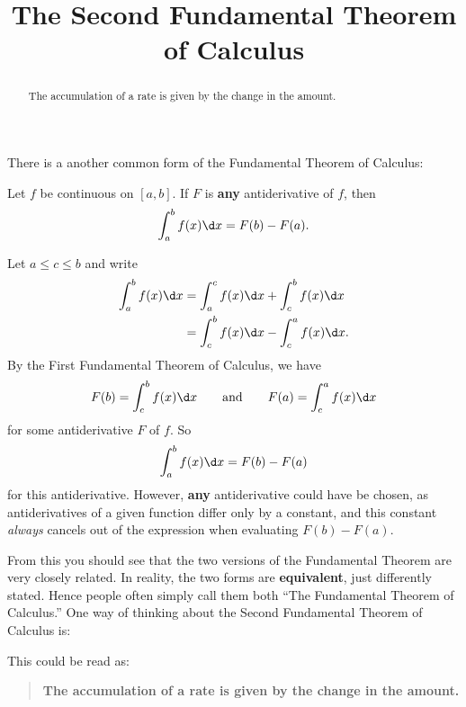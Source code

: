 \documentclass{ximera}
\title[Dig-In:]{The Second Fundamental Theorem of Calculus}
\begin{document}
\begin{abstract}
The accumulation of a rate is given by the change in the amount.
\end{abstract}
\maketitle




There is a another common form of the Fundamental Theorem of Calculus:

\begin{theorem}
  Let $f$ be continuous on $[a,b]$. If $F$ is \textbf{any}
  antiderivative of $f$, then
  \[
  \int_a^b f(x)\d x = F(b)-F(a).
  \]
  \begin{explanation}
    Let $a\le c\le b$ and write
    \begin{align*}
      \int_a^b f(x) \d x &= \int_a^c f(x) \d x + \int_c^b f(x) \d x \\
      &= \int_c^b f(x) \d x - \int_c^a f(x) \d x.
    \end{align*}
    By the First Fundamental Theorem of Calculus, we have
    \[
    F(b) = \int_c^b f(x) \d x\qquad\text{and}\qquad F(a) = \int_c^a f(x) \d x
    \] 
    for some antiderivative $F$ of $f$. So
    \[
    \int_a^b f(x) \d x = F(b)-F(a)
    \]
    for this antiderivative. However, \textbf{any} antiderivative
    could have be chosen, as antiderivatives of a given function
    differ only by a constant, and this constant \textit{always}
    cancels out of the expression when evaluating $F(b)-F(a)$.
\end{explanation}
\end{theorem}

From this you should see that the two versions of the Fundamental
Theorem are very closely related. In reality, the two forms are
\textbf{equivalent}, just differently stated. Hence people often
simply call them both ``The Fundamental Theorem of Calculus.''
One way of thinking about the Second Fundamental Theorem of Calculus is:
\begin{image}
\end{image}
This could be read as:%
\begin{quote}\large\textbf{The accumulation of a rate is given by the change in the amount.}
\end{quote}
\end{document}
